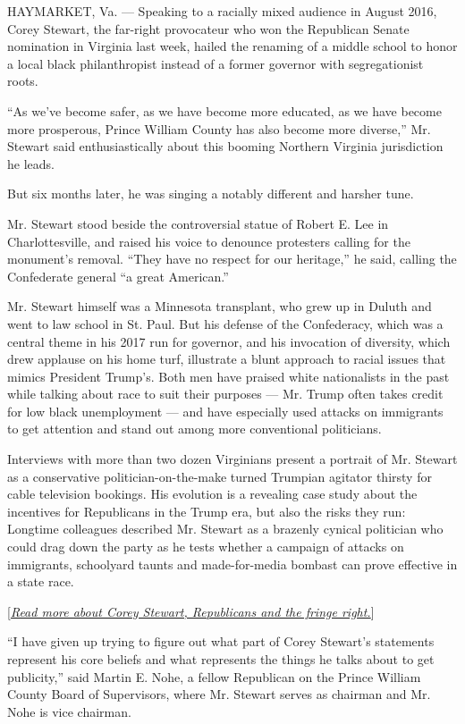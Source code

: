 HAYMARKET, Va. --- Speaking to a racially mixed audience in August 2016,
Corey Stewart, the far-right provocateur who won the Republican Senate
nomination in Virginia last week, hailed the renaming of a middle school
to honor a local black philanthropist instead of a former governor with
segregationist roots.

``As we've become safer, as we have become more educated, as we have
become more prosperous, Prince William County has also become more
diverse,'' Mr. Stewart said enthusiastically about this booming Northern
Virginia jurisdiction he leads.

But six months later, he was singing a notably different and harsher
tune.

Mr. Stewart stood beside the controversial statue of Robert E. Lee in
Charlottesville, and raised his voice to denounce protesters calling for
the monument's removal. ``They have no respect for our heritage,'' he
said, calling the Confederate general ``a great American.''

Mr. Stewart himself was a Minnesota transplant, who grew up in Duluth
and went to law school in St. Paul. But his defense of the Confederacy,
which was a central theme in his 2017 run for governor, and his
invocation of diversity, which drew applause on his home turf,
illustrate a blunt approach to racial issues that mimics President
Trump's. Both men have praised white nationalists in the past while
talking about race to suit their purposes --- Mr. Trump often takes
credit for low black unemployment --- and have especially used attacks
on immigrants to get attention and stand out among more conventional
politicians.

Interviews with more than two dozen Virginians present a portrait of Mr.
Stewart as a conservative politician-on-the-make turned Trumpian
agitator thirsty for cable television bookings. His evolution is a
revealing case study about the incentives for Republicans in the Trump
era, but also the risks they run: Longtime colleagues described Mr.
Stewart as a brazenly cynical politician who could drag down the party
as he tests whether a campaign of attacks on immigrants, schoolyard
taunts and made-for-media bombast can prove effective in a state race.

{[}\emph{\href{https://www.nytimes3xbfgragh.onion/2018/06/13/us/politics/corey-stewart-virginia.html}{Read
more about Corey Stewart, Republicans and the fringe right.}}{]}

``I have given up trying to figure out what part of Corey Stewart's
statements represent his core beliefs and what represents the things he
talks about to get publicity,'' said Martin E. Nohe, a fellow Republican
on the Prince William County Board of Supervisors, where Mr. Stewart
serves as chairman and Mr. Nohe is vice chairman.

